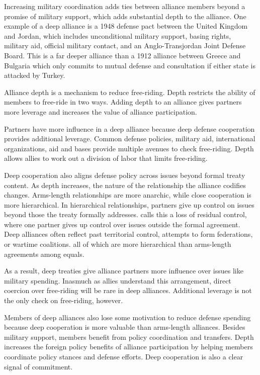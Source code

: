 \documentclass[12pt]{article}
\begin{document}
Increasing military coordination adds ties between alliance members beyond a promise of military support, which adds substantial depth to the alliance. 
One example of a deep alliance is a 1948 defense pact between the United Kingdom and Jordan, which includes unconditional military support, basing rights, military aid, official military contact, and an Anglo-Transjordan Joint Defense Board.  
This is a far deeper alliance than a 1912 alliance between Greece and Bulgaria which only commits to mutual defense and consultation if either state is attacked by Turkey. 


Alliance depth is a mechanism to reduce free-riding. 
Depth restricts the ability of members to free-ride in two ways. 
Adding depth to an alliance gives partners more leverage and increases the value of alliance participation. 


Partners have more influence in a deep alliance because deep defense cooperation provides additional leverage. 
Common defense policies, military aid, international organizations, aid and bases provide multiple avenues to check free-riding. 
Depth allows allies to work out a division of labor that limits free-riding. 


Deep cooperation also aligns defense policy across issues beyond formal treaty content. 
As depth increases, the nature of the relationship the alliance codifies changes. 
Arms-length relationships are more anarchic, while close cooperation is more hierarchical. 
In hierarchical relationships, partners give up control on issues beyond those the treaty formally addresses. 
\citet{Lake1996} calls this a loss of residual control, where one partner gives up control over issues outside the formal agreement. 
Deep alliances often reflect past territorial control, attempts to form federations, or wartime coalitions. all of which are more hierarchical than arms-length agreements among equals. 


As a result, deep treaties give alliance partners more influence over issues like military spending.
Inasmuch as allies understand this arrangement, direct coercion over free-riding will be rare in deep alliances.  
Additional leverage is not the only check on free-riding, however. 


Members of deep alliances also lose some motivation to reduce defense spending because deep cooperation is more valuable than arms-length alliances. 
Besides military support, members benefit from policy coordination and transfers. 
Depth increases the foreign policy benefits of alliance participation by helping members coordinate policy stances and defense efforts.
Deep cooperation is also a clear signal of commitment.  
\end{document}
